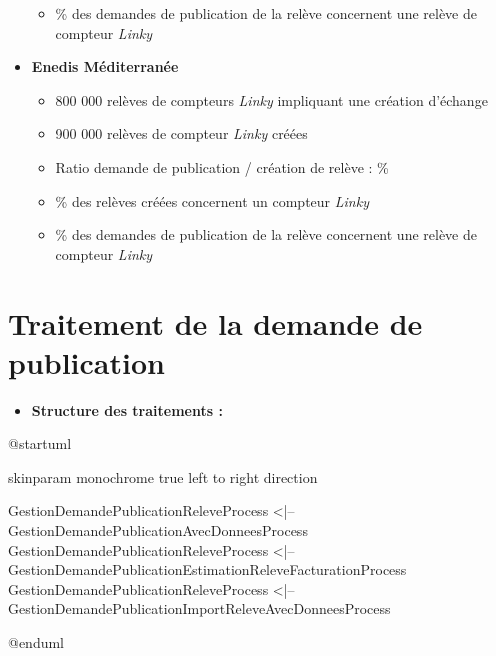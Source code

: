\documentclass[a4paper, 12pt]{report}
\begin{document}
\begin{itemize}
\begin{itemize}
    \item \approx{}\% des demandes de publication de la relève concernent une relève de compteur \textit{Linky}
  \end{itemize}
  \item \textbf{Enedis Méditerranée}
  \begin{itemize}
    \item \approx{} 800 000 relèves de compteurs \textit{Linky} impliquant une création d'échange
    \item \approx{} 900 000 relèves de compteur \textit{Linky} créées
    \item Ratio demande de publication / création de relève : \approx{}\%
    \item \approx{}\% des relèves créées concernent un compteur \textit{Linky}
    \item \approx{}\% des demandes de publication de la relève concernent une relève de compteur \textit{Linky}
  \end{itemize}
\end{itemize}

\chapter{Traitement de la demande de publication}
\label{appendix:process}

\begin{itemize}
  \item \textbf{Structure des traitements :}\\
\end{itemize}

\begin{center}
  \begin{plantuml}
    @startuml

    skinparam monochrome true
    left to right direction

    GestionDemandePublicationReleveProcess <|-- GestionDemandePublicationAvecDonneesProcess
    GestionDemandePublicationReleveProcess <|-- GestionDemandePublicationEstimationReleveFacturationProcess
    GestionDemandePublicationReleveProcess <|-- GestionDemandePublicationImportReleveAvecDonneesProcess

    @enduml
  \end{plantuml}
\end{center}
\vspace{0.5cm}
\end{document}

